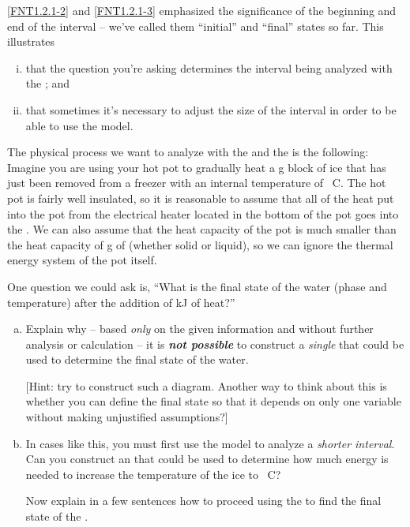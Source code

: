 \label{FNT1.2.1-4}

\ref{FNT1.2.1-2} and \ref{FNT1.2.1-3} emphasized the significance of the beginning and end of the interval -- we've called them ``initial'' and ``final'' states so far. This \FNT{} illustrates
\begin{enumerate}[(i)]

	\item that the question you're asking determines the interval being analyzed with the \EnergyInteractionModel{}; and

	\item that sometimes it's necessary to adjust the size of the interval in order to be able to use the model.

\end{enumerate}

\noindent The physical process we want to analyze with the \ThreePhaseModel{} and the \EnergyInteractionModel{} is the following:\\

\noindent Imagine you are using your hot pot to gradually heat a \unit[500]{g} block of ice that has just been removed from a freezer with an internal temperature of \unit[-25]{\textdegree C}. The hot pot is fairly well insulated, so it is reasonable to assume that all of the heat put into the pot from the electrical heater located in the bottom of the pot goes into the . We can also assume that the heat capacity of the pot is much smaller than the heat capacity of \unit[500]{g} of  (whether solid or liquid), so we can ignore the thermal energy system of the pot itself.

One question we could ask is, ``What is the final state of the water (phase and temperature) after the addition of \unit[252]{kJ} of heat?'' 

\begin{enumerate}[(a)]

	\item Explain why -- based {\em only} on the given information and without further analysis or calculation -- it is \textbf{\em not possible} to construct a {\em single} \EnergyDiagram{} that could be used to determine the final state of the water.
	
		[Hint: try to construct such a diagram. Another way to think about this is whether you can define the final state so that it depends on only one variable without making unjustified assumptions?]

	\item In cases like this, you must first use the model to analyze a {\em shorter interval}. Can you construct an \EnergyDiagram{} that could be used to determine how much energy is needed to increase the temperature of the ice to \unit[0]{\textdegree C}?
	
		Now explain in a few sentences how to proceed using the \EnergyInteractionModel{} to find the final state of the .

\end{enumerate}
